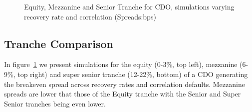 \begin{figure}
{}
\caption{\label{fig:CorRecSurface}Equity, Mezzanine and Senior Tranche for CDO, simulations varying recovery rate and correlation (Spreads:bps)}
\end{figure}

\subsection{Tranche Comparison}

In figure~\ref{fig:CorRecSurface} we present simulations for the equity (0-3\%, top left), mezzanine (6-9\%, top right) and super senior tranche (12-22\%, bottom) of a CDO generating the breakeven spread across recovery rates and correlation defaults. Mezzanine spreads are lower that those of the Equity tranche with the Senior  and Super Senior tranches being even lower.

